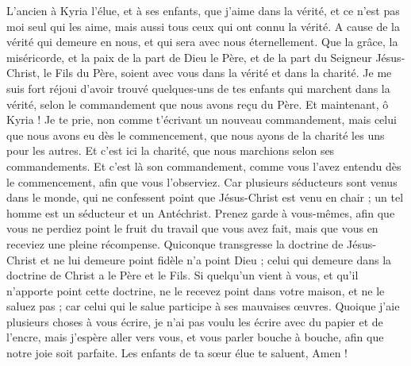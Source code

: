 \BFont
\begin{multicols}{2}
\TextTitle{[Introduction]}
\VerseOne{}L'ancien à Kyria l’élue, et à ses enfants, que j'aime dans la vérité, et ce n’est pas moi seul qui les aime, mais aussi tous ceux qui ont connu la vérité.
A cause de la vérité qui demeure en nous, et qui sera avec nous éternellement.
Que la grâce, la miséricorde, et la paix de la part de Dieu le Père, et de la part du Seigneur Jésus-Christ, le Fils du Père, soient avec vous dans la vérité et dans la charité.
Je me suis fort réjoui d'avoir trouvé quelques-uns de tes enfants qui marchent dans la vérité, selon le commandement que nous avons reçu du Père.
Et maintenant, ô Kyria ! Je te prie, non comme t'écrivant un nouveau commandement, mais celui que nous avons eu dès le commencement, que nous ayons de la charité les uns pour les autres.
Et c'est ici la charité, que nous marchions selon ses commandements. Et c'est là son commandement, comme vous l'avez entendu dès le commencement, afin que vous l'observiez.
Car plusieurs séducteurs sont venus dans le monde, qui ne confessent point que Jésus-Christ est venu en chair ; un tel homme est un séducteur et un Antéchrist.
Prenez garde à vous-mêmes, afin que vous ne perdiez point le fruit du travail que vous avez fait, mais que vous en receviez une pleine récompense.
Quiconque transgresse la doctrine de Jésus-Christ et ne lui demeure point fidèle n'a point Dieu ; celui qui demeure dans la doctrine de Christ a le Père et le Fils.
Si quelqu'un vient à vous, et qu'il n'apporte point cette doctrine, ne le recevez point dans votre maison, et ne le saluez pas ;
car celui qui le salue participe à ses mauvaises œuvres.
\TextTitle{[Conclusion]}
Quoique j’aie plusieurs choses à vous écrire, je n’ai pas voulu les écrire avec du papier et de l'encre, mais j'espère aller vers vous, et vous parler bouche à bouche, afin que notre joie soit parfaite.
Les enfants de ta sœur élue te saluent, Amen !
\PPE{}
\end{multicols}
